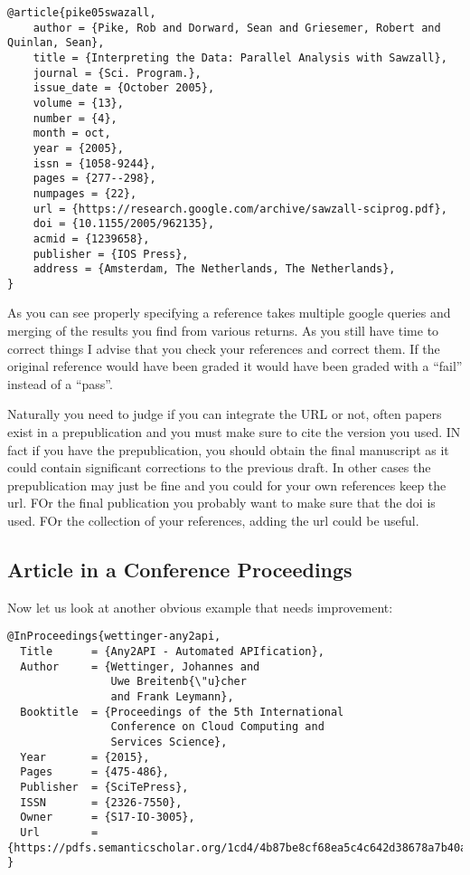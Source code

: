 \begin{verbatim}
@article{pike05swazall,
    author = {Pike, Rob and Dorward, Sean and Griesemer, Robert and Quinlan, Sean},
    title = {Interpreting the Data: Parallel Analysis with Sawzall},
    journal = {Sci. Program.},
    issue_date = {October 2005},
    volume = {13},
    number = {4},
    month = oct,
    year = {2005},
    issn = {1058-9244},
    pages = {277--298},
    numpages = {22},
    url = {https://research.google.com/archive/sawzall-sciprog.pdf},
    doi = {10.1155/2005/962135},
    acmid = {1239658},
    publisher = {IOS Press},
    address = {Amsterdam, The Netherlands, The Netherlands},
}
\end{verbatim}

As you can see properly specifying a reference takes multiple google
queries and merging of the results you find from various returns. As
you still have time to correct things I advise that you check your
references and correct them. If the original reference would have been
graded it would have been graded with a ``fail'' instead of a ``pass''.

Naturally you need to judge if you can integrate the URL or not, often
papers exist in a prepublication and you must make sure to cite the
version you used. IN fact if you have the prepublication, you should
obtain the final manuscript as it could contain significant
corrections to the previous draft. In other cases the prepublication
may just be fine and you could for your own references keep the
url. FOr the final publication you probably want to make sure that the
doi is used. FOr the collection of your references, adding the url
could be useful.

\subsection{Article in a Conference Proceedings}
\label{s:e:article-in-a-conference-proceedings}

Now let us look at another obvious example that needs improvement:

\begin{verbatim}
@InProceedings{wettinger-any2api,
  Title      = {Any2API - Automated APIfication},
  Author     = {Wettinger, Johannes and
                Uwe Breitenb{\"u}cher
                and Frank Leymann},
  Booktitle  = {Proceedings of the 5th International
                Conference on Cloud Computing and
                Services Science},
  Year       = {2015},
  Pages      = {475-486},
  Publisher  = {SciTePress},
  ISSN       = {2326-7550},
  Owner      = {S17-IO-3005},
  Url        = {https://pdfs.semanticscholar.org/1cd4/4b87be8cf68ea5c4c642d38678a7b40a86de.pdf}
}
\end{verbatim}

